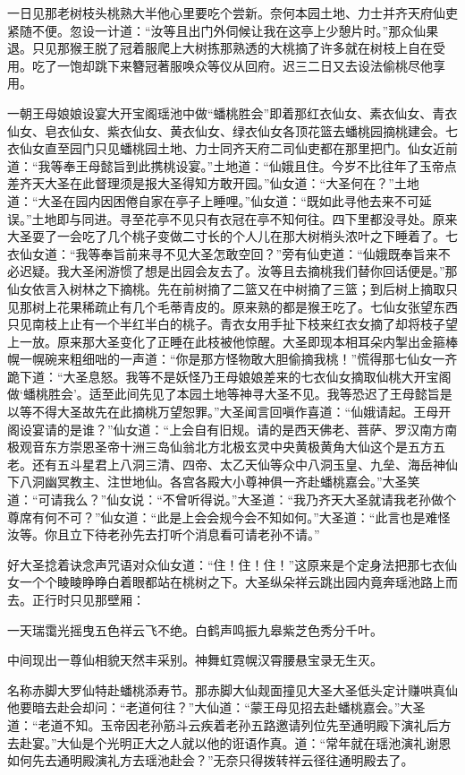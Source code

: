 \documentclass[12pt,UTF8]{ctexbook}
\begin{document}
{一日见那老树枝头桃熟大半他心里要吃个尝新。奈何本园土地、力士并齐天府仙吏紧随不便。忽设一计道：“汝等且出门外伺候让我在这亭上少憩片时。”那众仙果退。只见那猴王脱了冠着服爬上大树拣那熟透的大桃摘了许多就在树枝上自在受用。吃了一饱却跳下来簪冠著服唤众等仪从回府。迟三二日又去设法偷桃尽他享用。

一朝王母娘娘设宴大开宝阁瑶池中做“蟠桃胜会”即着那红衣仙女、素衣仙女、青衣仙女、皂衣仙女、紫衣仙女、黄衣仙女、绿衣仙女各顶花篮去蟠桃园摘桃建会。七衣仙女直至园门只见蟠桃园土地、力士同齐天府二司仙吏都在那里把门。仙女近前道：“我等奉王母懿旨到此携桃设宴。”土地道：“仙娥且住。今岁不比往年了玉帝点差齐天大圣在此督理须是报大圣得知方敢开园。”仙女道：“大圣何在？”土地道：“大圣在园内因困倦自家在亭子上睡哩。”仙女道：“既如此寻他去来不可延误。”土地即与同进。寻至花亭不见只有衣冠在亭不知何往。四下里都没寻处。原来大圣耍了一会吃了几个桃子变做二寸长的个人儿在那大树梢头浓叶之下睡着了。七衣仙女道：“我等奉旨前来寻不见大圣怎敢空回？”旁有仙吏道：“仙娥既奉旨来不必迟疑。我大圣闲游惯了想是出园会友去了。汝等且去摘桃我们替你回话便是。”那仙女依言入树林之下摘桃。先在前树摘了二篮又在中树摘了三篮；到后树上摘取只见那树上花果稀疏止有几个毛蒂青皮的。原来熟的都是猴王吃了。七仙女张望东西只见南枝上止有一个半红半白的桃子。青衣女用手扯下枝来红衣女摘了却将枝子望上一放。原来那大圣变化了正睡在此枝被他惊醒。大圣即现本相耳朵内掣出金箍棒幌一幌碗来粗细咄的一声道：“你是那方怪物敢大胆偷摘我桃！”慌得那七仙女一齐跪下道：“大圣息怒。我等不是妖怪乃王母娘娘差来的七衣仙女摘取仙桃大开宝阁做‘蟠桃胜会’。适至此间先见了本园土地等神寻大圣不见。我等恐迟了王母懿旨是以等不得大圣故先在此摘桃万望恕罪。”大圣闻言回嗔作喜道：“仙娥请起。王母开阁设宴请的是谁？”仙女道：“上会自有旧规。请的是西天佛老、菩萨、罗汉南方南极观音东方崇恩圣帝十洲三岛仙翁北方北极玄灵中央黄极黄角大仙这个是五方五老。还有五斗星君上八洞三清、四帝、太乙天仙等众中八洞玉皇、九垒、海岳神仙下八洞幽冥教主、注世地仙。各宫各殿大小尊神俱一齐赴蟠桃嘉会。”大圣笑道：“可请我么？”仙女说：“不曾听得说。”大圣道：“我乃齐天大圣就请我老孙做个尊席有何不可？”仙女道：“此是上会会规今会不知如何。”大圣道：“此言也是难怪汝等。你且立下待老孙先去打听个消息看可请老孙不请。”

好大圣捻着诀念声咒语对众仙女道：“住！住！住！”这原来是个定身法把那七衣仙女一个个睖睖睁睁白着眼都站在桃树之下。大圣纵朵祥云跳出园内竟奔瑶池路上而去。正行时只见那壁厢：

一天瑞霭光摇曳五色祥云飞不绝。白鹤声鸣振九皋紫芝色秀分千叶。

中间现出一尊仙相貌天然丰采别。神舞虹霓幌汉霄腰悬宝录无生灭。

名称赤脚大罗仙特赴蟠桃添寿节。那赤脚大仙觌面撞见大圣大圣低头定计赚哄真仙他要暗去赴会却问：“老道何往？”大仙道：“蒙王母见招去赴蟠桃嘉会。”大圣道：“老道不知。玉帝因老孙筋斗云疾着老孙五路邀请列位先至通明殿下演礼后方去赴宴。”大仙是个光明正大之人就以他的诳语作真。道：“常年就在瑶池演礼谢恩如何先去通明殿演礼方去瑶池赴会？”无奈只得拨转祥云径往通明殿去了。

}
\end{document}
